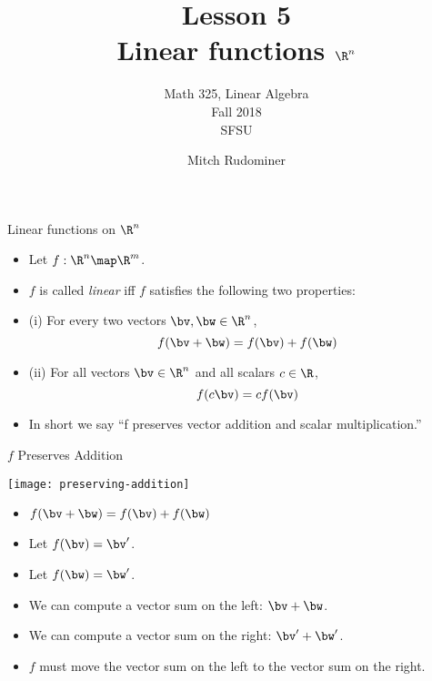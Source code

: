 \documentclass{beamer}
\title{Lesson 5 \\ Linear functions $\R^n$}
\subtitle{Math 325, Linear Algebra \\ Fall 2018 \\ SFSU}
\author{Mitch Rudominer}
\date{}
\begin{document}
\begin{frame}
  \titlepage
\end{frame}

\begin{frame}{Linear functions on $\R^n$}

\begin{itemize}
\item Let $f:\R^n \map \R^m$.
\item $f$ is called \emph{linear} iff $f$ satisfies the following two properties:
\item (i) For every two vectors $\bv, \bw \in\R^n$, $$f(\bv + \bw) = f(\bv) + f(\bw)$$
\item (ii) For all vectors $\bv\in\R^n$ and all scalars $c\in \R$,
$$f(c \bv) = c f(\bv)$$
\item In short we say ``f preserves vector addition and scalar multiplication.''
\end{itemize}

\end{frame}

\begin{frame}{$f$ Preserves Addition}

\begin{center}
\texttt{[image: preserving-addition]}
\end{center}

\begin{itemize}
\item $f(\bv + \bw) = f(\bv) + f(\bw)$
\item Let $f(\bv) = \bv^{\prime}$.
\item Let $f(\bw) = \bw^{\prime}$.
\item We can compute a vector sum on the left: $\bv + \bw$.
\item We can compute a vector sum on the right: $\bv^{\prime} + \bw^{\prime}$.
\item $f$ must move the vector sum on the left to the vector sum on the right.
\end{itemize}

\end{frame}

\end{document}

